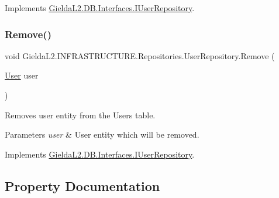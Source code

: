Implements \mbox{\hyperlink{interface_gielda_l2_1_1_d_b_1_1_interfaces_1_1_i_user_repository_a8a8920b50795c07316baf914e70f5ee3}{Gielda\+L2.\+D\+B.\+Interfaces.\+I\+User\+Repository}}.

\mbox{\label{class_gielda_l2_1_1_i_n_f_r_a_s_t_r_u_c_t_u_r_e_1_1_repositories_1_1_user_repository_a8715ce2a146a846905609162c41a6483}} 
\subsubsection{\texorpdfstring{Remove()}{Remove()}}
{\footnotesize\ttfamily void Gielda\+L2.\+I\+N\+F\+R\+A\+S\+T\+R\+U\+C\+T\+U\+R\+E.\+Repositories.\+User\+Repository.\+Remove (\begin{DoxyParamCaption}\item[{\mbox{\hyperlink{class_gielda_l2_1_1_d_b_1_1_entities_1_1_user}{User}}}]{user }\end{DoxyParamCaption})}



Removes user entity from the Users table. 


\begin{DoxyParams}{Parameters}
{\em user} & User entity which will be removed.\\
\hline
\end{DoxyParams}


Implements \mbox{\hyperlink{interface_gielda_l2_1_1_d_b_1_1_interfaces_1_1_i_user_repository_ad353a86a583d55065532459823c413f2}{Gielda\+L2.\+D\+B.\+Interfaces.\+I\+User\+Repository}}.



\subsection{Property Documentation}
\mbox{\label{class_gielda_l2_1_1_i_n_f_r_a_s_t_r_u_c_t_u_r_e_1_1_repositories_1_1_user_repository_aec266d4cd489b911934e5317390c3cc4}} 
